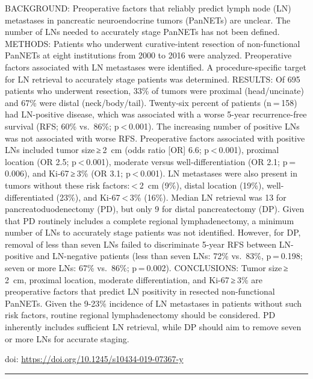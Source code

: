 \documentclass[]{article}
\begin{document}
BACKGROUND: Preoperative factors that reliably predict lymph node (LN)
metastases in pancreatic neuroendocrine tumors (PanNETs) are unclear.
The number of LNs needed to accurately stage PanNETs has not been
defined. METHODS: Patients who underwent curative-intent resection of
non-functional PanNETs at eight institutions from 2000 to 2016 were
analyzed. Preoperative factors associated with LN metastases were
identified. A procedure-specific target for LN retrieval to accurately
stage patients was determined. RESULTS: Of 695 patients who underwent
resection, 33\% of tumors were proximal (head/uncinate) and 67\% were
distal (neck/body/tail). Twenty-six percent of patients (n = 158) had
LN-positive disease, which was associated with a worse 5-year
recurrence-free survival (RFS; 60\% vs.~86\%; p \textless{} 0.001). The
increasing number of positive LNs was not associated with worse RFS.
Preoperative factors associated with positive LNs included tumor
size ≥ 2~cm (odds ratio {[}OR{]} 6.6; p \textless{} 0.001), proximal
location (OR 2.5; p \textless{} 0.001), moderate versus
well-differentiation (OR 2.1; p = 0.006), and Ki-67 ≥ 3\% (OR 3.1;
p \textless{} 0.001). LN metastases were also present in tumors without
these risk factors: \textless{} 2~cm (9\%), distal location (19\%),
well-differentiated (23\%), and Ki-67 \textless{} 3\% (16\%). Median LN
retrieval was 13 for pancreatoduodenectomy (PD), but only 9 for distal
pancreatectomy (DP). Given that PD routinely includes a complete
regional lymphadenectomy, a minimum number of LNs to accurately stage
patients was not identified. However, for DP, removal of less than seven
LNs failed to discriminate 5-year RFS between LN-positive and
LN-negative patients (less than seven LNs: 72\% vs.~83\%, p = 0.198;
seven or more LNs: 67\% vs.~86\%; p = 0.002). CONCLUSIONS: Tumor
size ≥ 2~cm, proximal location, moderate differentiation, and
Ki-67 ≥ 3\% are preoperative factors that predict LN positivity in
resected non-functional PanNETs. Given the 9-23\% incidence of LN
metastases in patients without such risk factors, routine regional
lymphadenectomy should be considered. PD inherently includes sufficient
LN retrieval, while DP should aim to remove seven or more LNs for
accurate staging.

doi: \url{https://doi.org/10.1245/s10434-019-07367-y}

{}

{}

\begin{center}\rule{0.5\linewidth}{\linethickness}\end{center}
\end{document}
